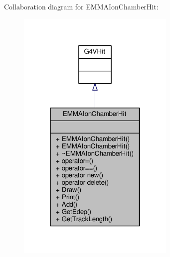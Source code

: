 Collaboration diagram for E\+M\+M\+A\+Ion\+Chamber\+Hit\+:
\nopagebreak
\begin{figure}[H]
\begin{center}
\leavevmode
\includegraphics[width=214pt]{classEMMAIonChamberHit__coll__graph}
\end{center}
\end{figure}
